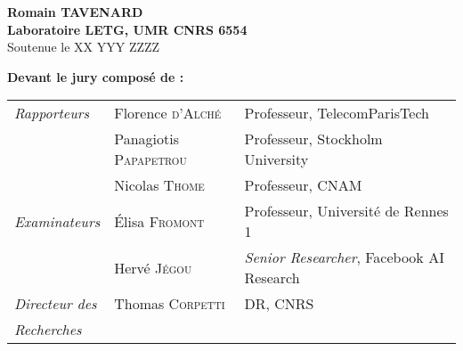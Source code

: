 \begin{titlepage}
\begin{center}
\vspace{-1cm}
\noindent {\large \textbf{}} \\
\vspace*{.2cm}
 \\
 \\
\vspace*{.8cm}
\\

\vspace*{1.5cm}

\sffamily

 \\
 \vspace*{0.8cm}

\vspace*{1.5cm}
\noindent \LARGE  \textbf{ Romain T{\Large AVENARD}} \\
\vspace*{1cm}\rmfamily
 \noindent \large \textbf{  Laboratoire LETG, UMR CNRS 6554 } \\
 \vspace*{2cm}
 \noindent \large Soutenue le XX YYY ZZZZ \\
 \vspace*{1cm}
\end{center}
\noindent \large \textbf{Devant le jury composé de :} \\
\begin{center}
\noindent \large
\begin{tabular}{lll}
      \textit{Rapporteurs}	& Florence {\scshape d'Alché} & Professeur, TelecomParisTech\\
                                & Panagiotis {\scshape Papapetrou} & Professeur, Stockholm University\\
                                & Nicolas {\scshape Thome} & Professeur, CNAM\\
      \textit{Examinateurs}     & Élisa {\scshape Fromont} & Professeur, Université de Rennes 1\\
                                & Hervé {\scshape Jégou} & \emph{Senior Researcher}, Facebook AI Research\\
      \textit{Directeur des}    & Thomas {\scshape Corpetti} & DR, CNRS \\
      \textit{Recherches}    & & \\


\end{tabular}
\end{center}
\end{titlepage}

